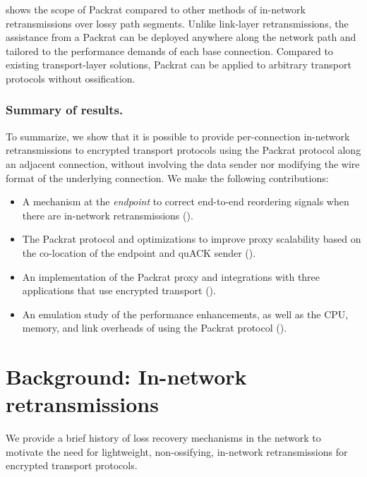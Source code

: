 

\noindent {} shows the scope of Packrat compared
to other methods of in-network retransmissions over lossy path segments.
Unlike link-layer retransmissions, the assistance from a Packrat can be
deployed anywhere along the network path and tailored to the performance
demands of each base connection. Compared to existing transport-layer
solutions, Packrat can be applied to arbitrary transport protocols without
ossification.

\subsubsection{Summary of results.}
To summarize, we show that it is possible to provide per-connection in-network
retransmissions to encrypted transport protocols using the Packrat protocol along
an adjacent connection, without involving the data sender nor modifying the
wire format of the underlying connection. We make the following contributions:

\begin{itemize}[noitemsep]
    \item A mechanism at the \textit{endpoint} to correct
     end-to-end reordering signals when there are in-network retransmissions
     ().
    \item The Packrat protocol and optimizations to improve proxy
     scalability based on the co-location of the endpoint and quACK sender
     ().
    \item An implementation of the Packrat proxy and integrations with three
     applications that use encrypted transport ().
    \item An emulation study of the performance enhancements, as well as the CPU,
     memory, and link overheads of using the Packrat protocol ().
\end{itemize}

\section{Background: In-network retransmissions}
\label{sec:packrat:background}

We provide a brief history of loss recovery mechanisms in the network to
motivate the need for lightweight, non-ossifying, in-network retransmissions
for encrypted transport protocols.

